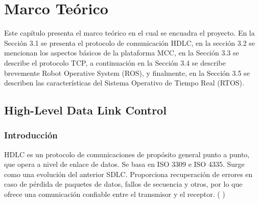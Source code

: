 \documentclass[withindex,glossary]{cam-thesis}
\begin{document}
\chapter{Marco Teórico}
Este capítulo presenta el marco teórico en el cual se encuadra el proyecto. En la Sección 3.1 se presenta el protocolo de comunicación HDLC, en la sección 3.2 se mencionan los aspectos básicos de la plataforma MCC, en la Sección 3.3 se describe el protocolo TCP, a continuación en la Sección 3.4 se describe brevemente Robot Operative System (ROS), y finalmente, en la Sección 3.5 se describen las características del Sistema Operativo de Tiempo Real (RTOS).

\section{High-Level Data Link Control} \label{sec:MarcoTeo :: HDLC}

\subsection{Introducción}
HDLC es un protocolo de comunicaciones de propósito general punto a punto, que opera a nivel de enlace de datos. Se basa en ISO 3309 e ISO 4335. Surge como una evolución del anterior SDLC. Proporciona recuperación de errores en caso de pérdida de paquetes de datos, fallos de secuencia y otros, por lo que ofrece una comunicación confiable entre el transmisor y el receptor. (\cite{RFC2687} \cite{RFC1662})
\end{document}
